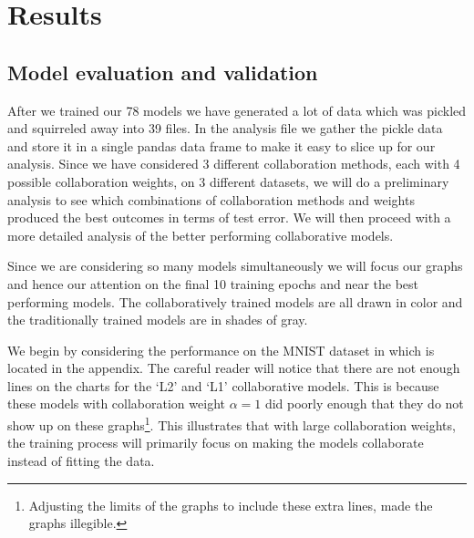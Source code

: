 \documentclass[english,a4paper,oneside]{amsart}
\theoremstyle{definition}
\begin{document}
\section{Results}
\subsection{Model evaluation and validation}
After we trained our 78 models we have generated a lot of data which was pickled and squirreled away into 39 files. In the analysis file we gather the pickle data and store it in a single pandas data frame to make it easy to slice up for our analysis. Since we have considered 3 different collaboration methods, each with 4 possible collaboration weights, on 3 different datasets, we will do a preliminary analysis to see which combinations of collaboration methods and weights produced the best outcomes in terms of test error. We will then proceed with a more detailed analysis of the better performing collaborative models. 

Since we are considering so many models simultaneously we will focus our graphs and hence our attention on the final 10 training epochs and near the best performing models. The collaboratively trained models are all drawn in color and the traditionally trained models are in shades of gray.

We begin by considering the performance on the MNIST dataset in  which is located in the appendix. The careful reader will notice that there are not enough lines on the charts for the `L2' and `L1' collaborative models. This is because these models with collaboration weight $\alpha=1$ did poorly enough that they do not show up on these graphs\footnote{Adjusting the limits of the graphs to include these extra lines, made the graphs illegible.}. This illustrates that with large collaboration weights, the training process will primarily focus on making the models collaborate instead of fitting the data. 
\end{document}
